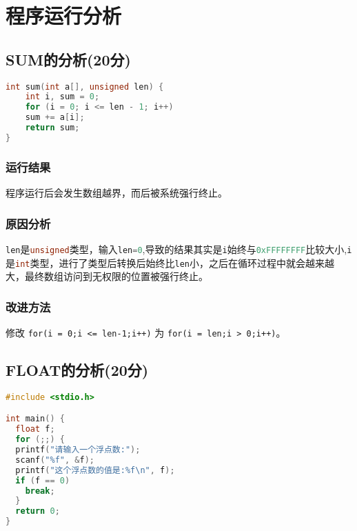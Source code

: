 \section{程序运行分析}
\subsection{SUM的分析(20分)}

\begin{lstlisting}[language = c]
int sum(int a[], unsigned len) {
	int i, sum = 0;
	for (i = 0; i <= len - 1; i++)
	sum += a[i];
	return sum;
}
\end{lstlisting}

\subsubsection{运行结果}程序运行后会发生数组越界，而后被系统强行终止。

\subsubsection{原因分析}\lstinline[language=c]|len|是\lstinline[language=c]|unsigned|类型，输入\lstinline[language=c]|len=0|,导致的结果其实是\lstinline[language=c]|i|始终与\lstinline[language=c]|0xFFFFFFFF|比较大小,\lstinline[language=c]|i|是\lstinline[language=c]|int|类型，进行了类型后转换后始终比\lstinline[language=c]|len|小，之后在循环过程中就会越来越大，最终数组访问到无权限的位置被强行终止。

\subsubsection{改进方法}修改 \lstinline|for(i = 0;i <= len-1;i++)| 为 \lstinline|for(i = len;i > 0;i++)|。

\subsection{FLOAT的分析(20分)} 
\begin{lstlisting}[language = c]
#include <stdio.h>

int main() {
  float f;
  for (;;) {
  printf("请输入一个浮点数:");
  scanf("%f", &f);
  printf("这个浮点数的值是:%f\n", f);
  if (f == 0)
    break;
  }
  return 0;
}
\end{lstlisting}

